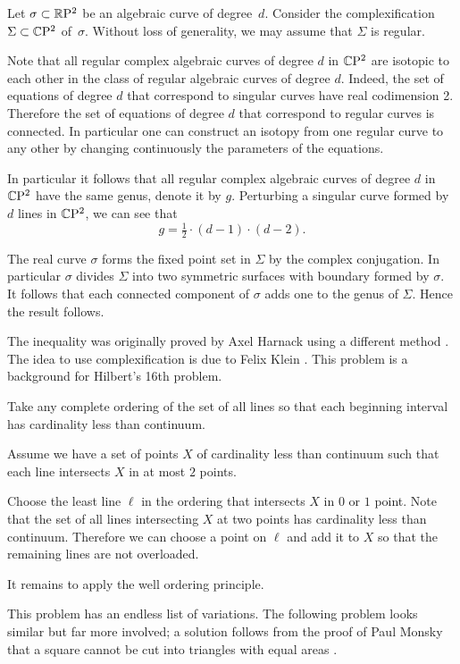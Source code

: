 Let $\sigma\subset \mathbb{R}\mathrm{P}^2$ be an algebraic curve of degree~$d$.
Consider the complexification $\Sigma\subset \mathbb{C}\mathrm{P}^2$ of~$\sigma$.
Without loss of generality, we may assume that $\Sigma$ is regular.

Note that all regular complex algebraic curves of degree $d$ in $\mathbb{C}\mathrm{P}^2$
are isotopic to each other in the class of regular algebraic curves of degree $d$.
Indeed, the set of equations of degree $d$ that correspond to singular curves have real codimension 2.
Therefore the set of equations of degree $d$ that correspond to regular curves is connected.
In particular one can construct an isotopy from one regular curve to any other by changing continuously the parameters of the equations.

In particular it follows that all regular complex algebraic curves of degree $d$ in $\mathbb{C}\mathrm{P}^2$ have the same genus,
denote it by $g$.
Perturbing a singular curve formed by $d$ lines in $\mathbb{C}\mathrm{P}^2$,
we can see that 
\[g=\tfrac12\cdot(d-1)\cdot(d-2).\]

The real curve $\sigma$ forms the fixed point set in $\Sigma$ 
by the complex conjugation. 
In particular $\sigma$ divides $\Sigma$ into two symmetric surfaces with boundary formed by $\sigma$.
It follows that each connected component of $\sigma$ adds one to the genus of $\Sigma$.
Hence the result follows.
\qeds
 
The inequality was originally proved 
by Axel Harnack using a different method \cite{harnack}.
The idea to use complexification is due to Felix Klein \cite{klein}.
This problem is a background for Hilbert's 16th problem. 

Take any complete ordering of the set of all lines 
so that each beginning interval has cardinality less than continuum.

Assume we have a set of points $X$ of cardinality less than continuum such that each line intersects $X$ in at most $2$ points.

Choose the least line $\ell$ in the ordering that intersects $X$ 
in $0$ or $1$ point.
Note that the set of all lines intersecting $X$ at two points has cardinality less than continuum.
Therefore we can choose a point on $\ell$ and add it to $X$ so that the remaining lines are not overloaded.

It remains to apply the well ordering principle.
\qeds

This problem has an endless list of variations.
The following problem looks similar but far more involved;
a solution follows from the proof of Paul Monsky that a square cannot be cut into triangles with equal areas \cite{monsky}.

